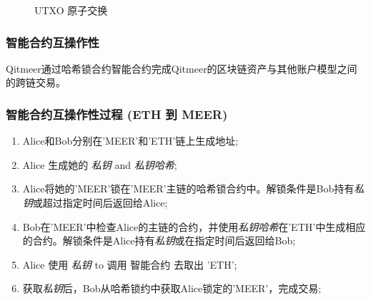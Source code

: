 \documentclass[a4paper,11pt]{article}
\begin{document}
\begin{figure}[hbt]
	\centerline{%
	}
\caption{UTXO 原子交换}
\end{figure}



\subsubsection{智能合约互操作性}

Qitmeer通过哈希锁合约智能合约完成Qitmeer的区块链资产与其他账户模型之间的跨链交易。

\subsubsection*{智能合约互操作性过程 (ETH 到 MEER)}

\begin{enumerate}
	\item  Alice和Bob分别在'MEER'和'ETH'链上生成地址;

	\item Alice 生成她的 \textit{私钥} and \textit{私钥哈希};

	\item Alice将她的'MEER'锁在'MEER'主链的哈希锁合约中。解锁条件是Bob持有\textit{私钥}或超过指定时间后返回给Alice;

	\item Bob在'MEER'中检查Alice的主链的合约，并使用\textit{私钥哈希}在'ETH'中生成相应的合约。解锁条件是Alice持有\textit{私钥}或在指定时间后返回给Bob;

	 \item  Alice 使用 \textit{私钥} to 调用 智能合约 去取出 'ETH';

	\item 获取\textit{私钥}后，Bob从哈希锁约中获取Alice锁定的'MEER'，完成交易;

\end{enumerate}
\end{document}
